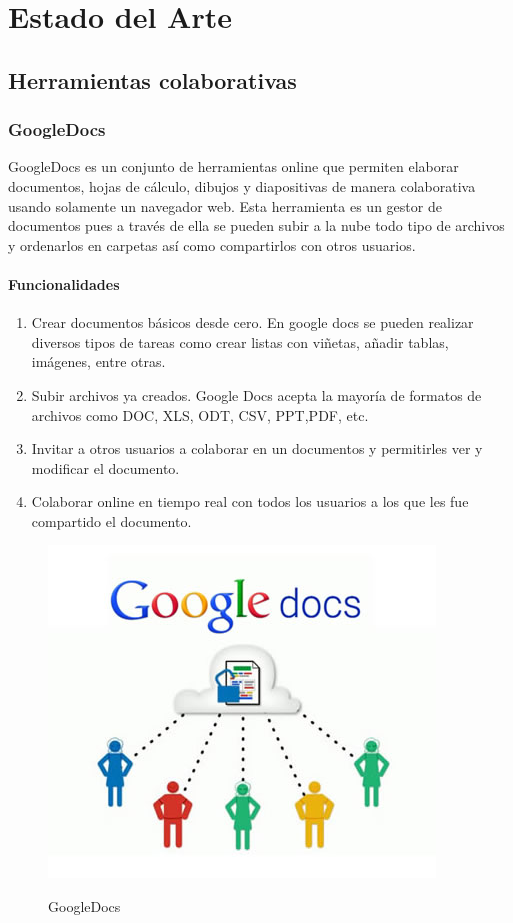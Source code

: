 \chapter{Estado del Arte}

\section{Herramientas colaborativas}

\subsection{GoogleDocs}

GoogleDocs es un conjunto de herramientas online que permiten elaborar documentos, hojas de cálculo, dibujos y diapositivas de manera colaborativa usando solamente un navegador web. Esta herramienta es un gestor de documentos pues a través de ella se pueden subir a la nube todo tipo de archivos y ordenarlos en carpetas así como compartirlos con otros usuarios.

\subsubsection{Funcionalidades}

\begin{enumerate}
  \item Crear documentos básicos desde cero. En google docs se pueden realizar diversos tipos de tareas como crear listas con viñetas, añadir tablas, imágenes, entre otras.
  \item Subir archivos ya creados. Google Docs acepta la mayoría de formatos de archivos como DOC, XLS, ODT, CSV, PPT,PDF, etc.
  \item Invitar a otros usuarios a colaborar en un documentos y permitirles ver y modificar el documento.
  \item Colaborar online en tiempo real con todos los usuarios a los que les fue compartido el documento.
\end{enumerate}
\begin{figure}[h]
  \centering
  \includegraphics[scale=0.8]{figuras/googledocs.jpg}\\
  \caption{GoogleDocs}\label{fig:googledocs}
\end{figure}





